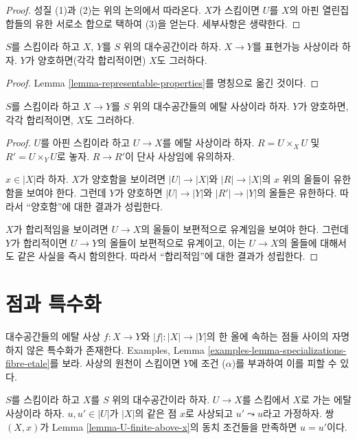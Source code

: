 \begin{proof}
\medskip\noindent
성질 (1)과 (2)는 위의 논의에서 따라온다. $X$가 스킴이면 $U$를
$X$의 아핀 열린집합들의 유한 서로소 합으로 택하여 (3)을 얻는다.
세부사항은 생략한다.
\end{proof}

\begin{lemma}
\label{lemma-representable-named-properties}
$S$를 스킴이라 하고 $X$, $Y$를 $S$ 위의 대수공간이라 하자.
$X \to Y$를 표현가능 사상이라 하자.
$Y$가 양호하면(각각 합리적이면) $X$도 그러하다.
\end{lemma}

\begin{proof}
Lemma \ref{lemma-representable-properties}를 명칭으로 옮긴 것이다.
\end{proof}

\begin{lemma}
\label{lemma-etale-named-properties}
$S$를 스킴이라 하고 $X \to Y$를 $S$ 위의 대수공간들의 에탈
사상이라 하자. $Y$가 양호하면, 각각 합리적이면, $X$도 그러하다.
\end{lemma}

\begin{proof}
$U$를 아핀 스킴이라 하고 $U \to X$를 에탈 사상이라 하자.
$R = U \times_X U$ 및 $R' = U \times_Y U$로 놓자.
$R \to R'$이 단사 사상임에 유의하자.

\medskip\noindent
$x \in |X|$라 하자. $X$가 양호함을 보이려면 $|U| \to |X|$와
$|R| \to |X|$의 $x$ 위의 올들이 유한함을 보여야 한다.
그런데 $Y$가 양호하면 $|U| \to |Y|$와 $|R'| \to |Y|$의 올들은
유한하다. 따라서 “양호함”에 대한 결과가 성립한다.

\medskip\noindent
$X$가 합리적임을 보이려면 $U \to X$의 올들이 보편적으로 유계임을
보여야 한다. 그런데 $Y$가 합리적이면 $U \to Y$의 올들이 보편적으로
유계이고, 이는 $U \to X$의 올들에 대해서도 같은 사실을 즉시 함의한다.
따라서 “합리적임”에 대한 결과가 성립한다.
\end{proof}


\section{점과 특수화}
\label{section-specializations}

\noindent
대수공간들의 에탈 사상 $f : X \to Y$와
$|f| : |X| \to |Y|$의 한 올에 속하는 점들 사이의 자명하지 않은
특수화가 존재한다. Examples, Lemma
\ref{examples-lemma-specializations-fibre-etale}를 보라.
사상의 원천이 스킴이면 $Y$에 조건 ($\alpha$)를 부과하여 이를 피할
수 있다.

\begin{lemma}
\label{lemma-no-specializations-map-to-same-point}
$S$를 스킴이라 하고 $X$를 $S$ 위의 대수공간이라 하자.
$U \to X$를 스킴에서 $X$로 가는 에탈 사상이라 하자.
$u, u' \in |U|$가 $|X|$의 같은 점 $x$로 사상되고
$u' \leadsto u$라고 가정하자. 쌍 $(X, x)$가 Lemma
\ref{lemma-U-finite-above-x}의 동치 조건들을 만족하면 $u = u'$이다.
\end{lemma}

